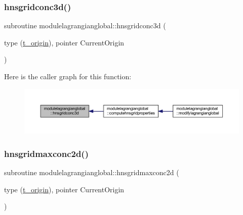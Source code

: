 \subsubsection{\texorpdfstring{hnsgridconc3d()}{hnsgridconc3d()}}
{\footnotesize\ttfamily subroutine modulelagrangianglobal\+::hnsgridconc3d (\begin{DoxyParamCaption}\item[{type (\mbox{\hyperlink{structmodulelagrangianglobal_1_1t__origin}{t\+\_\+origin}}), pointer}]{Current\+Origin }\end{DoxyParamCaption})\hspace{0.3cm}{\ttfamily [private]}}

Here is the caller graph for this function\+:\nopagebreak
\begin{figure}[H]
\begin{center}
\leavevmode
\includegraphics[width=350pt]{namespacemodulelagrangianglobal_a8c236ab2fa5219dffb9444c1ed075d48_icgraph}
\end{center}
\end{figure}
\mbox{\label{namespacemodulelagrangianglobal_ae8087b21cc2eb799dc6cc0ca8fca855a}} 
\subsubsection{\texorpdfstring{hnsgridmaxconc2d()}{hnsgridmaxconc2d()}}
{\footnotesize\ttfamily subroutine modulelagrangianglobal\+::hnsgridmaxconc2d (\begin{DoxyParamCaption}\item[{type (\mbox{\hyperlink{structmodulelagrangianglobal_1_1t__origin}{t\+\_\+origin}}), pointer}]{Current\+Origin }\end{DoxyParamCaption})\hspace{0.3cm}{\ttfamily [private]}}

